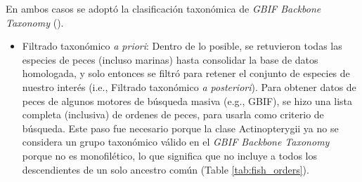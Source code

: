 \documentclass[sn-apa,pdflatex]{sn-jnl}
\newenvironment{Shaded}{\begin{snugshade}}{\end{snugshade}}
\newcommand{\AttributeTok}[1]{\textcolor[rgb]{0.13,0.29,0.53}{#1}}
\newcommand{\CommentTok}[1]{\textcolor[rgb]{0.56,0.35,0.01}{\textit{#1}}}
\newcommand{\DecValTok}[1]{\textcolor[rgb]{0.00,0.00,0.81}{#1}}
\newcommand{\FunctionTok}[1]{\textcolor[rgb]{0.13,0.29,0.53}{\textbf{#1}}}
\newcommand{\NormalTok}[1]{#1}
\newcommand{\OtherTok}[1]{\textcolor[rgb]{0.56,0.35,0.01}{#1}}
\newcommand{\SpecialCharTok}[1]{\textcolor[rgb]{0.81,0.36,0.00}{\textbf{#1}}}
\newcommand{\StringTok}[1]{\textcolor[rgb]{0.31,0.60,0.02}{#1}}
\providecommand{\tightlist}{%
  \setlength{\itemsep}{0pt}\setlength{\parskip}{0pt}}
\begin{document}
En ambos casos se adoptó la clasificación taxonómica de \emph{GBIF
Backbone Taxonomy}
(\href{https://www.gbif.org/dataset/d7dddbf4-2cf0-4f39-9b2a-bb099caae36c}{\citet{GBIF-Secretariat2023}}).

\begin{itemize}
\tightlist
\item
  Filtrado taxonómico \emph{a priori}: Dentro de lo posible, se
  retuvieron todas las especies de peces (incluso marinas) hasta
  consolidar la base de datos homologada, y solo entonces se filtró para
  retener el conjunto de especies de nuestro interés (i.e., Filtrado
  taxonómico \emph{a posteriori}). Para obtener datos de peces de
  algunos motores de búsqueda masiva (e.g., GBIF), se hizo una lista
  completa (inclusiva) de ordenes de peces, para usarla como criterio de
  búsqueda. Este paso fue necesario porque la clase Actinopterygii ya no
  se considera un grupo taxonómico válido en el \emph{GBIF Backbone
  Taxonomy} porque no es monofilético, lo que significa que no incluye a
  todos los descendientes de un solo ancestro común (Table
  \ref{tab:fish_orders}).
\end{itemize}

\begin{Shaded}
\end{Shaded}

\begingroup\fontsize{7}{9}\selectfont
\end{document}
